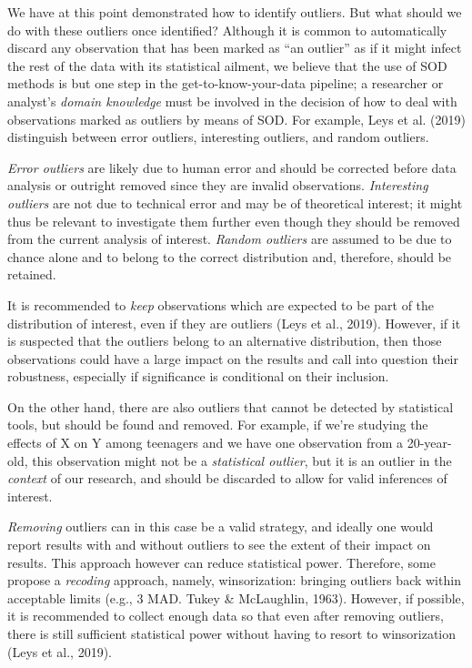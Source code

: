 \documentclass[
]{article}
\begin{document}
We have at this point demonstrated how to identify outliers. But what should we do with these outliers once identified? Although it is common to automatically discard any observation that has been marked as ``an outlier'' as if it might infect the rest of the data with its statistical ailment, we believe that the use of SOD methods is but one step in the get-to-know-your-data pipeline; a researcher or analyst's \emph{domain knowledge} must be involved in the decision of how to deal with observations marked as outliers by means of SOD. For example, Leys et al. (2019) distinguish between error outliers, interesting outliers, and random outliers.

\emph{Error outliers} are likely due to human error and should be corrected before data analysis or outright removed since they are invalid observations. \emph{Interesting outliers} are not due to technical error and may be of theoretical interest; it might thus be relevant to investigate them further even though they should be removed from the current analysis of interest. \emph{Random outliers} are assumed to be due to chance alone and to belong to the correct distribution and, therefore, should be retained.

It is recommended to \emph{keep} observations which are expected to be part of the distribution of interest, even if they are outliers (Leys et al., 2019). However, if it is suspected that the outliers belong to an alternative distribution, then those observations could have a large impact on the results and call into question their robustness, especially if significance is conditional on their inclusion.

On the other hand, there are also outliers that cannot be detected by statistical tools, but should be found and removed. For example, if we're studying the effects of X on Y among teenagers and we have one observation from a 20-year-old, this observation might not be a \emph{statistical outlier}, but it is an outlier in the \emph{context} of our research, and should be discarded to allow for valid inferences of interest.

\emph{Removing} outliers can in this case be a valid strategy, and ideally one would report results with and without outliers to see the extent of their impact on results. This approach however can reduce statistical power. Therefore, some propose a \emph{recoding} approach, namely, winsorization: bringing outliers back within acceptable limits (e.g., 3 MAD. Tukey \& McLaughlin, 1963). However, if possible, it is recommended to collect enough data so that even after removing outliers, there is still sufficient statistical power without having to resort to winsorization (Leys et al., 2019).
\end{document}
